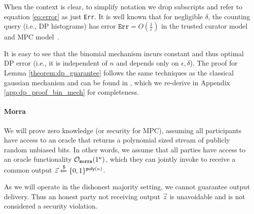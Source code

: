 When the context is clear, to simplify notation we drop subscripts and refer to equation \eqref{eq:error} as just \texttt{Err}.
It is well known that for negligible $\delta$, the counting query (i.e., DP histograms) has error $\texttt{Err} = O(\frac{1}{\epsilon})$ in the trusted curator model and MPC model~\cite{vadhan2017complexity, corrigan-gibbs_prio_2017}.



%
It is easy to see that the binomial mechanism incurs constant and thus optimal DP error (i.e., it is independent of $n$ and depends only on $\epsilon, \delta$). The proof for Lemma \ref{theorem:dp_guarantee} follows the same techniques as the classical gaussian mechanism and can be found in \cite{ghazi_power_2020}, which we re-derive in Appendix \ref{app:dp_proof_bin_mech} for completeness.




\paragraph{Morra}
\label{sec: morra}
We will prove zero knowledge (or security for MPC), assuming all participants have access to an oracle that returns a polynomial sized stream of publicly random unbiased bits. 
In other words, we assume that all parties have access to an oracle functionality $\mathcal{O}_{\mathtt{morra}}(1^{\kappa})$, which they can jointly invoke to receive a common output $\vec{z} \xleftarrow{\$} \{ 0, 1\}^{\mathsf{poly}(\kappa)}$. 

\begin{remark} As we will operate in the dishonest majority setting, we cannot guarantee output delivery. Thus an honest party not receiving output $\vec{z}$ is unavoidable and is not considered a security violation.
\end{remark}

